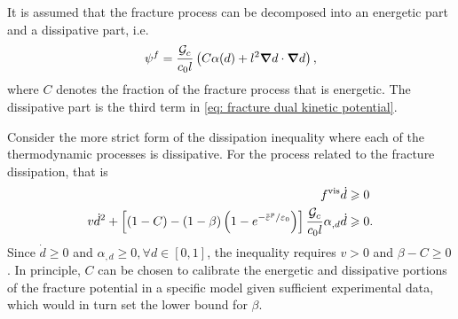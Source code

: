 It is assumed that the fracture process can be decomposed into an energetic part and a dissipative part, i.e.
\begin{align}
  \psi^f = \dfrac{{\mathcal{G}_c}}{c_0 l} \left( C\alpha(d) + l^2 \boldsymbol{\nabla} d \cdot \boldsymbol{\nabla} d \right), \label{eq: modified fracture energy} \\
\end{align}
where $C$ denotes the fraction of the fracture process that is energetic. The dissipative part is the third term in \eqref{eq: fracture dual kinetic potential}.

\begin{remark}
  Consider the more strict form of the dissipation inequality where each of the thermodynamic processes is dissipative. For the process related to the fracture dissipation, that is
  \begin{align*}
    f^\text{vis} \dot{d}                                                                                                           & \geqslant 0  \\
    v \dot{d}^2 + \left[ (1-C) - (1-\beta) \left( 1-e^{-\ep/\varepsilon_0} \right) \right] \dfrac{\Gc}{c_0 l} \alpha_{, d} \dot{d} & \geqslant 0.
  \end{align*}
  Since $\dot{d} \geqslant 0$ and $\alpha_{, d} \geqslant 0, \forall d \in [0, 1]$, the inequality requires $v > 0$ and $\beta - C \geqslant 0$.  In principle, $C$ can be chosen to calibrate the energetic and dissipative portions of the fracture potential in a specific model given sufficient experimental data, which would in turn set the lower bound for $\beta$.
\end{remark}

